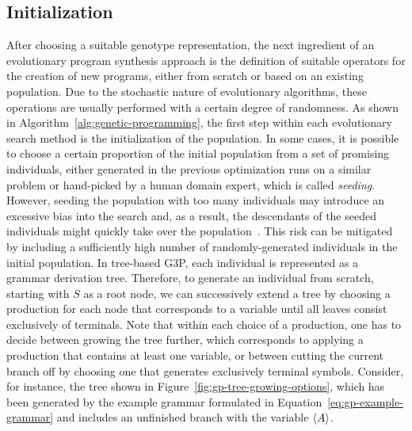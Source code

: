 \subsection{Initialization}
\label{sec:gggp-initialization}
After choosing a suitable genotype representation, the next ingredient of an evolutionary program synthesis approach is the definition of suitable operators for the creation of new programs, either from scratch or based on an existing population.
Due to the stochastic nature of evolutionary algorithms, these operations are usually performed with a certain degree of randomness.
As shown in Algorithm~\ref{alg:genetic-programming}, the first step within each evolutionary search method is the initialization of the population. 
In some cases, it is possible to choose a certain proportion of the initial population from a set of promising individuals, either generated in the previous optimization runs on a similar problem or hand-picked by a human domain expert, which is called \emph{seeding}.
However, seeding the population with too many individuals may introduce an excessive bias into the search and, as a result, the descendants of the seeded individuals might quickly take over the population~\cite{poli2008field}.
This risk can be mitigated by including a sufficiently high number of randomly-generated individuals in the initial population. 
In tree-based G3P, each individual is represented as a grammar derivation tree.
Therefore, to generate an individual from scratch, starting with $S$ as a root node, we can successively extend a tree by choosing a production for each node that corresponds to a variable until all leaves consist exclusively of terminals.
Note that within each choice of a production, one has to decide between growing the tree further, which corresponds to applying a production that contains at least one variable, or between cutting the current branch off by choosing one that generates exclusively terminal symbols.
Consider, for instance, the tree shown in Figure~\ref{fig:gp-tree-growing-options}, which has been generated by the example grammar formulated in Equation~\eqref{eq:gp-example-grammar} and includes an unfinished branch with the variable $\langle A \rangle$.
